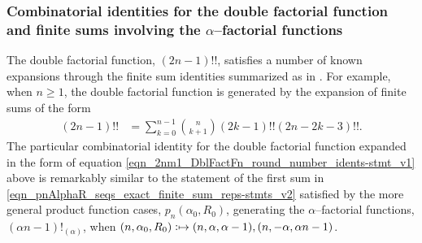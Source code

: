 \documentclass[12pt,reqno]{article}
\numberwithin{sfootnote}{section}
\numberwithin{equation}{section}
\theoremstyle{plain}
\theoremstyle{definition}
\theoremstyle{remark}
\newcommand{\defmapsto}{\ensuremath{\vcentcolon\mapsto}}
\newcommand{\AlphaFactorial}[2]{\ensuremath{\left(#1\right)!_{\left(#2\right)}}}
\newcommand{\pn}[3]{\ensuremath{p_{#1}\left(#2, #3\right)}}
\begin{document}
\subsubsection{Combinatorial identities for the 
               double factorial function and 
               finite sums involving the $\alpha$--factorial functions} 
\label{ssS_example_GenDblFactFnSumIdents_FiniteSumsInvolving_AlphaFactFns} 

The double factorial function, $(2n-1)!!$, satisfies a number of 
known expansions through the finite sum identities summarized as in 
\citep{MAA-FUN-WITH-DBLFACT,DBLFACTFN-COMBIDENTS-SURVEY}. 
For example, when $n \geq 1$, the 
double factorial function is generated by the 
expansion of finite sums of the form 
\citep[\S 4.1]{DBLFACTFN-COMBIDENTS-SURVEY} 
\begin{align} 
\label{eqn_2nm1_DblFactFn_round_number_idents-stmt_v1}
(2n-1)!! & = 
     \sum_{k=0}^{n-1} \binom{n}{k+1} (2k-1)!! (2n-2k-3)!!. 
\end{align} 
The particular combinatorial identity for the double factorial 
function expanded in the form of equation 
\eqref{eqn_2nm1_DblFactFn_round_number_idents-stmt_v1} above 
is remarkably similar to the statement of the first sum in 
\eqref{eqn_pnAlphaR_seqs_exact_finite_sum_reps-stmts_v2} 
satisfied by the more general product function cases, 
$\pn{n}{\alpha_0}{R_0}$, 
generating the $\alpha$--factorial functions, 
$\AlphaFactorial{\alpha n-1}{\alpha}$, when 
$(n, \alpha_0, R_0) \defmapsto (n, \alpha, \alpha-1), (n, -\alpha, \alpha n-1)$. 
\end{document}
